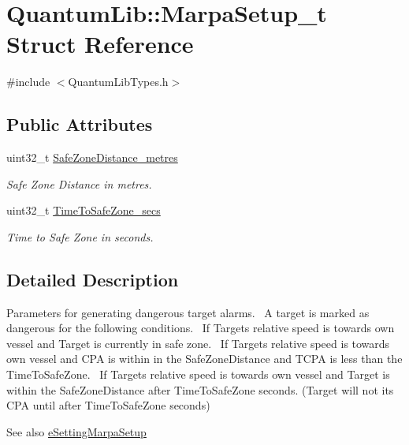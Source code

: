 \hypertarget{struct_quantum_lib_1_1_marpa_setup__t}{}\section{Quantum\+Lib\+:\+:Marpa\+Setup\+\_\+t Struct Reference}
\label{struct_quantum_lib_1_1_marpa_setup__t}


{\ttfamily \#include $<$Quantum\+Lib\+Types.\+h$>$}

\subsection*{Public Attributes}
\begin{DoxyCompactItemize}
\item 
uint32\+\_\+t \mbox{\hyperlink{struct_quantum_lib_1_1_marpa_setup__t_a6d2e136a87beafb7d3c6df389405ef28}{Safe\+Zone\+Distance\+\_\+metres}}
\begin{DoxyCompactList}\small\item\em Safe Zone Distance in metres. \end{DoxyCompactList}\item 
uint32\+\_\+t \mbox{\hyperlink{struct_quantum_lib_1_1_marpa_setup__t_ab50c2eea7b489bc3933a60d0c896b836}{Time\+To\+Safe\+Zone\+\_\+secs}}
\begin{DoxyCompactList}\small\item\em Time to Safe Zone in seconds. \end{DoxyCompactList}\end{DoxyCompactItemize}


\subsection{Detailed Description}
Parameters for generating dangerous target alarms.~\newline
A target is marked as dangerous for the following conditions.~\newline
If Targets relative speed is towards own vessel and Target is currently in safe zone.~\newline
If Targets relative speed is towards own vessel and C\+PA is within in the \textquotesingle{}Safe\+Zone\+Distance\textquotesingle{} and T\+C\+PA is less than the \textquotesingle{}Time\+To\+Safe\+Zone\textquotesingle{}.~\newline
If Targets relative speed is towards own vessel and Target is within the \textquotesingle{}Safe\+Zone\+Distance\textquotesingle{} after \textquotesingle{}Time\+To\+Safe\+Zone\textquotesingle{} seconds. (Target will not its C\+PA until after Time\+To\+Safe\+Zone seconds) \begin{DoxySeeAlso}{See also}
\mbox{\hyperlink{namespace_quantum_lib_acc8124e3e65bca4aa798d03a55e3d54cae0da3a53a8abab02dfaeebb7f79f2840}{e\+Setting\+Marpa\+Setup}} 
\end{DoxySeeAlso}


